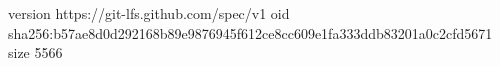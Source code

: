 version https://git-lfs.github.com/spec/v1
oid sha256:b57ae8d0d292168b89e9876945f612ce8cc609e1fa333ddb83201a0c2cfd5671
size 5566
